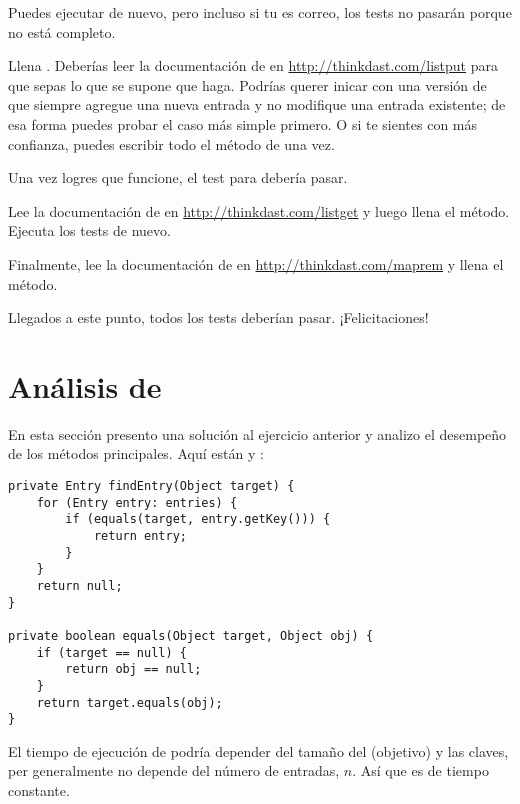 \documentclass[12pt]{book}
\theoremstyle{exercise}
\begin{document}

Puedes ejecutar  de nuevo, pero incluso si tu
 es correo, los tests no pasarán porque 
no está completo.


Llena . Deberías leer la documentación de
 en \url{http://thinkdast.com/listput} para que sepas lo que
se supone que haga. Podrías querer inicar con una versión de
 que siempre agregue una nueva entrada y no modifique una entrada
existente; de esa forma puedes probar el caso más simple primero. O si
te sientes con más confianza, puedes escribir todo el método de una vez.


Una vez logres que  funcione, el test para 
debería pasar.

Lee la documentación de  en
  \url{http://thinkdast.com/listget}
  y luego llena el método. Ejecuta los tests de nuevo.

Finalmente, lee la documentación de  en
  \url{http://thinkdast.com/maprem}
  y llena el método.

Llegados a este punto, todos los tests deberían pasar. ¡Felicitaciones!


\section{Análisis de }
\label{analyzing-mylinearmap}


En esta sección presento una solución al ejercicio anterior y
analizo el desempeño de los métodos principales. Aquí están
 y :

\begin{verbatim}
private Entry findEntry(Object target) {
    for (Entry entry: entries) {
        if (equals(target, entry.getKey())) {
            return entry;
        }
    }
    return null;
}

private boolean equals(Object target, Object obj) {
    if (target == null) {
        return obj == null;
    }
    return target.equals(obj);
}
\end{verbatim}

El tiempo de ejecución de  podría depender del tamaño del
 (objetivo) y las claves, per generalmente no depende del
número de entradas, $n$. Así que  es de tiempo constante.
\end{document}
